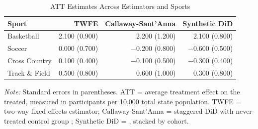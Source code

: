 \begin{table}[!htbp]
\centering
\caption{ATT Estimates Across Estimators and Sports}
\label{tab:results}
\begin{threeparttable}
\fontsize{11}{13}\selectfont
\begin{tabular}{lrrr}
\toprule
Sport & TWFE & Callaway-Sant'Anna & Synthetic DiD \\
\midrule
Basketball    & 2.100 (0.900) & 2.200 (1.200) & 2.100 (0.800) \\
Soccer        & 0.000 (0.700) & $-$0.200 (0.800) & $-$0.600 (0.500) \\
Cross Country & 0.100 (0.400) & $-$0.100 (0.500) & $-$0.300 (0.400) \\
Track \& Field & 0.500 (0.800) & 0.600 (1.000) & 0.300 (0.800) \\
\bottomrule
\end{tabular}
\begin{tablenotes}[flushleft]
\footnotesize
\item \textit{Note:} Standard errors in parentheses. ATT = average treatment
effect on the treated, measured in participants per 10,000 total state
population. TWFE = two-way fixed effects estimator; Callaway-Sant'Anna =
staggered DiD with never-treated control group \citep{csa_2021};
Synthetic DiD = \citet{arkhangelsky_synthetic_2021}, stacked by cohort.
\end{tablenotes}
\end{threeparttable}
\end{table}
